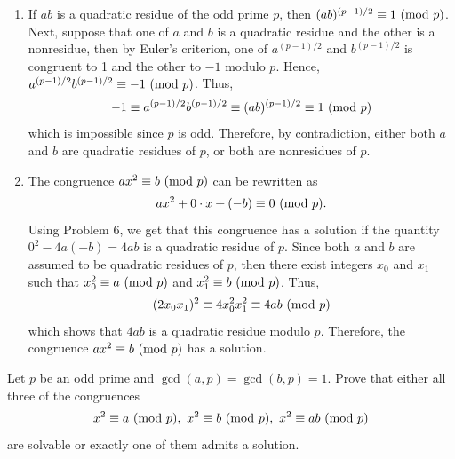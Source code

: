 \begin{solution}
    \begin{enumerate}
        \item If $ab$ is a quadratic residue of the odd prime $p$, then $(ab)^{(p-1)/2} \equiv 1 \ (\mathrm{mod}\ p)$. Next, suppose that one of $a$ and $b$ is a quadratic residue and the other is a nonresidue, then by Euler's criterion, one of $a^{(p-1)/2}$ and $b^{(p-1)/2}$ is congruent to 1 and the other to $-1$ modulo $p$. Hence, $a^{(p-1)/2}b^{(p-1)/2} \equiv -1 \ (\mathrm{mod}\ p)$. Thus,
        $$-1 \equiv a^{(p-1)/2}b^{(p-1)/2} \equiv (ab)^{(p-1)/2} \equiv 1 \ (\mathrm{mod}\ p)$$
        which is impossible since $p$ is odd. Therefore, by contradiction, either both $a$ and $b$ are quadratic residues of $p$, or both are nonresidues of $p$.
        \item The congruence $ax^2 \equiv b \ (\mathrm{mod}\ p)$ can be rewritten as
        $$ax^2 + 0\cdot x + (-b) \equiv 0 \ (\mathrm{mod}\ p).$$
        Using Problem 6, we get that this congruence has a solution if the quantity $0^2 - 4a(-b) = 4ab$ is a quadratic residue of $p$. Since both $a$ and $b$ are assumed to be quadratic residues of $p$, then there exist integers $x_0$ and $x_1$ such that $x_0^2 \equiv a \ (\mathrm{mod}\ p)$ and $x_1^2 \equiv b \ (\mathrm{mod}\ p)$. Thus,
        $$(2x_0x_1)^2 \equiv 4x_0^2x_1^2 \equiv 4ab \ (\mathrm{mod}\ p)$$
        which shows that $4ab$ is a quadratic residue modulo $p$. Therefore, the congruence $ax^2 \equiv b \ (\mathrm{mod}\ p)$ has a solution. \\
    \end{enumerate}
\end{solution}

\begin{exercise}
    Let $p$ be an odd prime and $\gcd(a,p) = \gcd(b,p) = 1$. Prove that either all three of the congruences
    $$x^2 \equiv a \ (\mathrm{mod}\ p), \ x^2 \equiv b \ (\mathrm{mod}\ p), \ x^2 \equiv ab \ (\mathrm{mod}\ p)$$
    are solvable or exactly one of them admits a solution. \\
\end{exercise}

